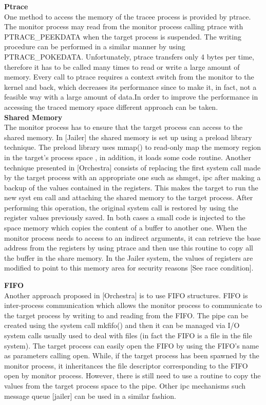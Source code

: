 \textbf{Ptrace}\\
One method to access the memory of the tracee process is provided by ptrace. The monitor process may read from the monitor process calling ptrace with PTRACE\_PEEKDATA when the target process is suspended. The writing procedure can be performed in a similar manner by using PTRACE\_POKEDATA. Unfortunately, ptrace transfers only 4 bytes per time, therefore it has to be called many times to read or write a large amount of memory. Every call to ptrace requires a context switch from the monitor to the kernel and back, which decreases its performance since to make it, in fact, not a feasible way with a large amount of data.In order to improve the performance in accessing the traced memory space different approach can be taken.\\

\textbf{Shared Memory}\\
The monitor process has to ensure that the target process can access to the shared memory. In [Jailer] the shared memory is set up using a preload library technique. The preload library uses mmap() to read-only map the memory region in the target’s process space , in addition, it loads some code routine. Another technique presented in [Orchestra] consists of replacing the first system call made by the target process with an appropriate one such as shmget, ipc after making a backup of the values contained in the registers.   This makes the target to run the new syst em call and attaching the shared memory to the target process. After performing this operation, the original system call is restored by using the register values previously saved.  In both cases a small code is injected to the space memory which copies the content of a buffer to another one. When the monitor process needs to access to an indirect arguments, it can retrieve the base address from the registers by using ptrace and then use this routine to copy all the buffer in the share memory. In the Jailer system, the values of registers are modified to point to this memory area for security reasons [See race condition].

\textbf{FIFO}\\
Another approach proposed in [Orchestra] is to use FIFO structures.  FIFO is inter-process communication which allows the monitor process to communicate to the target process by writing to and reading from the FIFO.  The pipe can be created using the system call mkfifo()\cite{Garfinkel03ostia:a} and then it can be managed via I/O system calls usually used to deal with files (in fact the FIFO is a file in the file system). 
The target process can easily open the FIFO by using the FIFO’s name as parameters calling open.  While, if the target process has been spawned by the monitor process, it inheritances the file descriptor corresponding to the FIFO open by monitor process. However, there is still need to use a routine to copy the values from the target process space to the pipe.  Other ipc mechanisms such message queue [jailer] can be used in a similar fashion. \\

